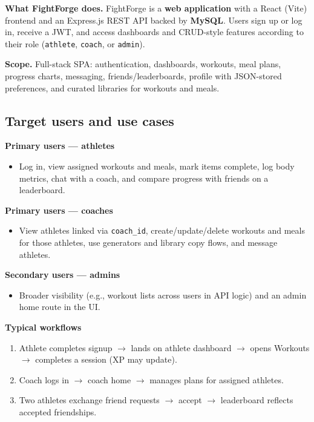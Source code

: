 \documentclass[11pt,letterpaper]{article}
\begin{document}
\textbf{What FightForge does.} FightForge is a \textbf{web application} with a React (Vite) frontend and an Express.js REST API backed by \textbf{MySQL}. Users sign up or log in, receive a JWT, and access dashboards and CRUD-style features according to their role (\texttt{athlete}, \texttt{coach}, or \texttt{admin}).

\textbf{Scope.} Full-stack SPA: authentication, dashboards, workouts, meal plans, progress charts, messaging, friends/leaderboards, profile with JSON-stored preferences, and curated libraries for workouts and meals.

\subsection{Target users and use cases}
\textbf{Primary users --- athletes}
\begin{itemize}[nosep]
  \item Log in, view assigned workouts and meals, mark items complete, log body metrics, chat with a coach, and compare progress with friends on a leaderboard.
\end{itemize}

\textbf{Primary users --- coaches}
\begin{itemize}[nosep]
  \item View athletes linked via \texttt{coach\_id}, create/update/delete workouts and meals for those athletes, use generators and library copy flows, and message athletes.
\end{itemize}

\textbf{Secondary users --- admins}
\begin{itemize}[nosep]
  \item Broader visibility (e.g., workout lists across users in API logic) and an admin home route in the UI.
\end{itemize}

\textbf{Typical workflows}
\begin{enumerate}[nosep]
  \item Athlete completes signup $\rightarrow$ lands on athlete dashboard $\rightarrow$ opens Workouts $\rightarrow$ completes a session (XP may update).
  \item Coach logs in $\rightarrow$ coach home $\rightarrow$ manages plans for assigned athletes.
  \item Two athletes exchange friend requests $\rightarrow$ accept $\rightarrow$ leaderboard reflects accepted friendships.
\end{enumerate}
\end{document}
